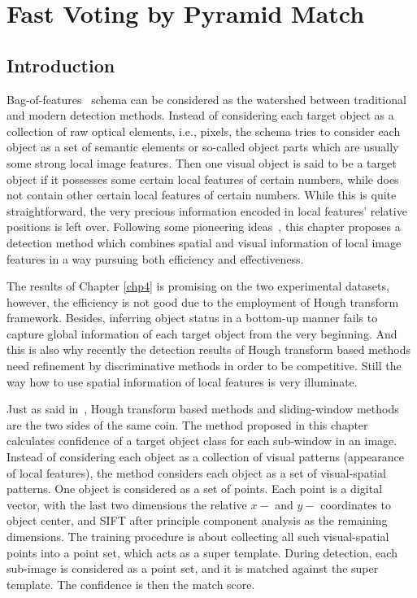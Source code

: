\chapter{Fast Voting by Pyramid Match}
\label{chp5}

\section{Introduction}

Bag-of-features~\citep{obof,bgf} schema can be considered as the watershed between traditional and modern detection methods. Instead of considering each target object as a collection of raw optical elements, i.e., pixels, the schema tries to consider each object as a set of semantic elements or so-called object parts which are usually some strong local image features. Then one visual object is said to be a target object if it possesses some certain local features of certain numbers, while does not contain other certain local features of certain numbers. While this is quite straightforward, the very precious information encoded in local features' relative positions is left over. Following some pioneering ideas~\citep{spmk,ac30}, this chapter proposes a detection method which combines spatial and visual information of local image features in a  way pursuing both efficiency and effectiveness.

The results of Chapter \ref{chp4} is promising on the two experimental datasets, however, the efficiency is not good due to the employment of Hough transform framework.
 Besides, inferring object status in a bottom-up manner fails to capture global information of each target object from the very beginning. And this is also why recently the detection results of Hough transform based methods need refinement by discriminative methods in order to be competitive. Still the way how to use spatial information of local features is very illuminate.

 Just as said in~\citep{ac27}, Hough transform based methods and sliding-window methods are the two sides of the same coin. The method proposed in this chapter calculates confidence of a target object class for each sub-window in an image. Instead of considering each object as a collection of visual patterns (appearance of local features), the method considers each object as a set of visual-spatial patterns. One object is considered as a set of points. Each point is a digital vector, with the last two dimensions the relative $x-$ and $y-$ coordinates to object center, and SIFT after principle component analysis as the remaining dimensions. The training procedure is about collecting all such visual-spatial points into a point set, which acts as a super template. During detection, each sub-image is considered as a point set, and it is matched against the super template. The confidence is then the match score.

